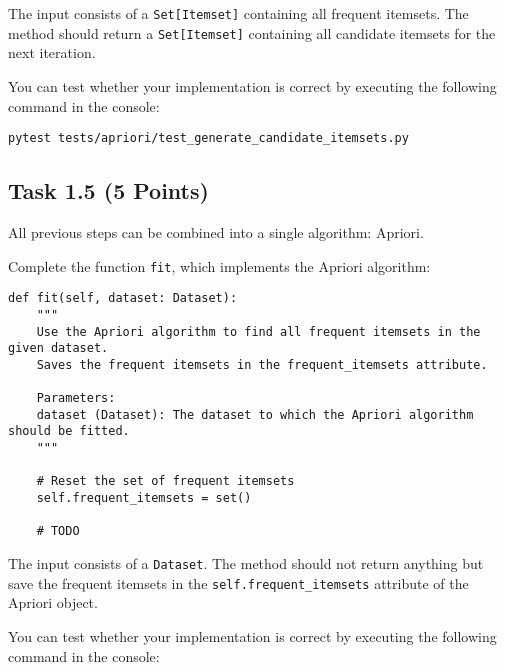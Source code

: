 \documentclass[
english,
smallborders
]{i6prcsht}
\newcommand{\points}[1]{\hfill \color{red}(#1 Points)\color{black}}
\begin{document}
\vspace*{0.1cm}

The input consists of a \texttt{Set[Itemset]} containing all frequent itemsets. The method should return a \texttt{Set[Itemset]} containing all candidate itemsets for the next iteration.

You can test whether your implementation is correct by executing the following command in the console:

\vspace*{0.3cm}

\begin{lstlisting}
pytest tests/apriori/test_generate_candidate_itemsets.py
\end{lstlisting}

\vspace*{0.1cm}

\subsection*{Task 1.5 \points{5}}

All previous steps can be combined into a single algorithm: Apriori.

Complete the function \texttt{fit}, which implements the Apriori algorithm:

\vspace*{0.3cm}

\begin{lstlisting}
def fit(self, dataset: Dataset):
	"""
	Use the Apriori algorithm to find all frequent itemsets in the given dataset.
	Saves the frequent itemsets in the frequent_itemsets attribute.

	Parameters:
	dataset (Dataset): The dataset to which the Apriori algorithm should be fitted.
	"""

	# Reset the set of frequent itemsets
	self.frequent_itemsets = set()

	# TODO
\end{lstlisting}

\vspace*{0.1cm}

The input consists of a \texttt{Dataset}. The method should not return anything but save the frequent itemsets in the \texttt{self.frequent\_itemsets} attribute of the Apriori object.

You can test whether your implementation is correct by executing the following command in the console:

\vspace*{0.3cm}
\end{document}
